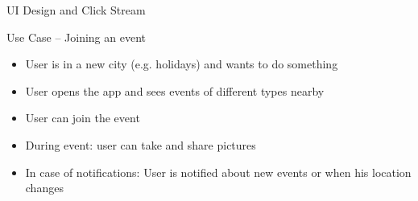 \documentclass[logo=EURECOM,english]{eurecombeamer}
\begin{document}
\begin{frame}{UI Design and Click Stream}
\begin{figure}
\end{figure}
\end{frame}

\begin{frame}{Use Case -- Joining an event}
\begin{itemize}
\item User is in a new city (e.g. holidays) and wants to do something
\item User opens the app and sees events of different types nearby
\item User can join the event
\item During event: user can take and share pictures
\item In case of notifications: User is notified about new events or when his location changes
\end{itemize}
\end{frame}
\end{document}
